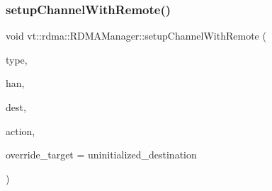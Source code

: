 \mbox{\label{structvt_1_1rdma_1_1_r_d_m_a_manager_abd4b573102bf0a4c7dd0687d257f7a0d}} 
\subsubsection{\texorpdfstring{setup\+Channel\+With\+Remote()}{setupChannelWithRemote()}}
{\footnotesize\ttfamily void vt\+::rdma\+::\+R\+D\+M\+A\+Manager\+::setup\+Channel\+With\+Remote (\begin{DoxyParamCaption}\item[{\hyperlink{namespacevt_1_1rdma_ac848e1d9da43db6294bd06f83e5d3946}{R\+D\+M\+A\+\_\+\+Type\+Type} const \&}]{type,  }\item[{\hyperlink{namespacevt_a10442579ec4e7ebef223818e64bcf908}{R\+D\+M\+A\+\_\+\+Handle\+Type} const \&}]{han,  }\item[{\hyperlink{namespacevt_a866da9d0efc19c0a1ce79e9e492f47e2}{Node\+Type} const \&}]{dest,  }\item[{\hyperlink{namespacevt_ae0a5a7b18cc99d7b732cb4d44f46b0f3}{Action\+Type} const \&}]{action,  }\item[{\hyperlink{namespacevt_a866da9d0efc19c0a1ce79e9e492f47e2}{Node\+Type} const \&}]{override\+\_\+target = {\ttfamily uninitialized\+\_\+destination} }\end{DoxyParamCaption})\hspace{0.3cm}{\ttfamily [private]}}

\mbox{\label{structvt_1_1rdma_1_1_r_d_m_a_manager_a4dd6beec7e4e1d3cc4c0ad3e8d0e7837}} 
